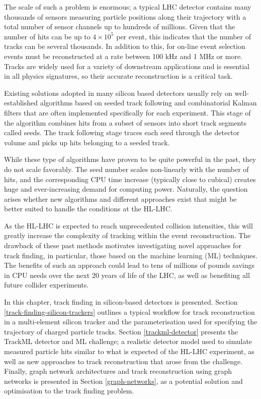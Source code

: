 The scale of such a problem is enormous; a typical LHC detector contains many thousands of sensors measuring particle positions along their trajectory with a total number of sensor channels up to hundreds of millions. Given that the number of hits can be up to $4 \times 10^{5}$ per event, this indicates that the number of tracks can be several thousands. In addition to this, for on-line event selection events must be reconstructed at a rate between 100 kHz and 1 MHz or more. Tracks are widely used for a variety of downstream applications and is essential in all physics signatures, so their accurate reconstruction is a critical task.   

Existing solutions adopted in many silicon based detectors usually rely on well-established algorithms based on seeded track following and combinatorial Kalman filters \cite{AGOSTINELLI2003250} that are often implemented specifically for each experiment. This stage of the algorithm combines hits from a subset of sensors into short track segments called seeds. The track following stage traces each seed through the detector volume and picks up hits belonging to a seeded track.

While these type of algorithms have proven to be quite powerful in the past, they do not scale favorably. The seed number scales non-linearly with the number of hits, and the corresponding CPU time increase (typically close to cubical) creates huge and ever-increasing demand for computing power. Naturally, the question arises whether new algorithms and different approaches exist that might be better suited to handle the conditions at the HL-LHC.

As the HL-LHC is expected to reach unprecedented collision intensities, this will greatly increase the complexity of tracking within the event reconstruction. The drawback of these past methods motivates investigating novel approaches for track finding, in particular, those based on the machine learning (ML) techniques. The benefits of such an approach could lead to tens of millions of pounds savings in CPU needs over the next 20 years of life of the LHC, as well as benefiting all future collider experiments.

In this chapter, track finding in silicon-based detectors is presented. Section \ref{track-finding-silicon-trackers} outlines a typical workflow for track reconstruction in a multi-element silicon tracker and the parameterisation used for specifying the trajectory of charged particle tracks. Section \ref{trackml-detector} presents the TrackML detector and ML challenge; a realistic detector model used to simulate measured particle hits similar to what is expected of the HL-LHC experiment, as well as new approaches to track reconstruction that arose from the challenge. Finally, graph network architectures and track reconstruction using graph networks is presented in Section \ref{graph-networks}, as a potential solution and optimisation to the track finding problem.

